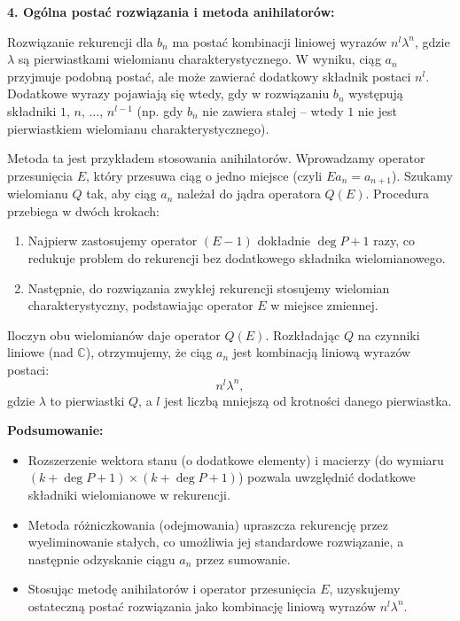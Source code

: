 \documentclass[12pt]{article}
\begin{document}
\bigskip

\textbf{4. Ogólna postać rozwiązania i metoda anihilatorów:}

Rozwiązanie rekurencji dla \( b_n \) ma postać kombinacji liniowej wyrazów \( n^l \lambda^n \), gdzie \( \lambda \) są pierwiastkami wielomianu charakterystycznego. W wyniku, ciąg \( a_n \) przyjmuje podobną postać, ale może zawierać dodatkowy składnik postaci \( n^l \). Dodatkowe wyrazy pojawiają się wtedy, gdy w rozwiązaniu \( b_n \) występują składniki \( 1,\, n,\, \dots,\, n^{l-1} \) (np. gdy \( b_n \) nie zawiera stałej – wtedy \( 1 \) nie jest pierwiastkiem wielomianu charakterystycznego).

Metoda ta jest przykładem stosowania anihilatorów. Wprowadzamy operator przesunięcia \( E \), który przesuwa ciąg o jedno miejsce (czyli \( Ea_n = a_{n+1} \)). Szukamy wielomianu \( Q \) tak, aby ciąg \( a_n \) należał do jądra operatora \( Q(E) \). Procedura przebiega w dwóch krokach:
\begin{enumerate}
    \item Najpierw zastosujemy operator \( (E-1) \) dokładnie \(\deg P + 1\) razy, co redukuje problem do rekurencji bez dodatkowego składnika wielomianowego.
    \item Następnie, do rozwiązania zwykłej rekurencji stosujemy wielomian charakterystyczny, podstawiając operator \( E \) w miejsce zmiennej.
\end{enumerate}
Iloczyn obu wielomianów daje operator \( Q(E) \). Rozkładając \( Q \) na czynniki liniowe (nad \(\mathbb{C}\)), otrzymujemy, że ciąg \( a_n \) jest kombinacją liniową wyrazów postaci:
\[
n^l \lambda^n,
\]
gdzie \(\lambda\) to pierwiastki \( Q\), a \( l \) jest liczbą mniejszą od krotności danego pierwiastka.

\bigskip

\textbf{Podsumowanie:}

\begin{itemize}
    \item Rozszerzenie wektora stanu (o dodatkowe elementy) i macierzy (do wymiaru \((k+\deg P+1) \times (k+\deg P+1)\)) pozwala uwzględnić dodatkowe składniki wielomianowe w rekurencji.
    \item Metoda różniczkowania (odejmowania) upraszcza rekurencję przez wyeliminowanie stałych, co umożliwia jej standardowe rozwiązanie, a następnie odzyskanie ciągu \( a_n \) przez sumowanie.
    \item Stosując metodę anihilatorów i operator przesunięcia \( E \), uzyskujemy ostateczną postać rozwiązania jako kombinację liniową wyrazów \( n^l \lambda^n \).
\end{itemize}
\newpage
\end{document}
